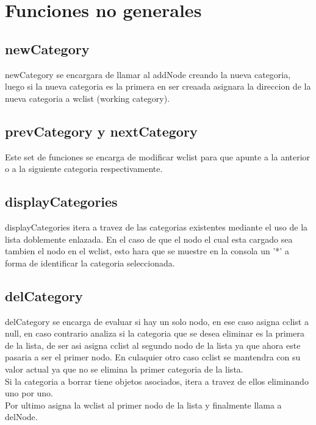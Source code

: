 \documentclass[]{article}
\begin{document}
\section{Funciones no generales}

\subsection{newCategory}
newCategory se encargara de llamar al addNode creando la nueva categoria, luego si la nueva categoria es la primera en ser creaada asignara la direccion de la nueva categoria a wclist (working category).\\

\subsection{prevCategory y nextCategory}
Este set de funciones se encarga de modificar wclist para que apunte a la anterior o a la siguiente categoria respectivamente.\\
\subsection{displayCategories}
displayCategories itera a travez de las categorias existentes mediante el uso de la lista doblemente enlazada. En el caso de que el nodo el cual esta cargado sea tambien el nodo en el wclist, esto hara que se muestre en la consola un '*' a forma de identificar la categoria seleccionada.\\
\subsection{delCategory}

delCategory se encarga de evaluar si hay un solo nodo, en ese caso asigna cclist a null, en caso contrario analiza si la categoria que se desea eliminar es la primera de la lista, de ser asi asigna cclist al segundo nodo de la lista ya que ahora este pasaria a ser el primer nodo. En culaquier otro caso cclist se mantendra con su valor actual ya que no se elimina la primer categoria de la lista.\\

Si la categoria a borrar tiene objetos asociados, itera a travez de ellos eliminando uno por uno.\\

Por ultimo asigna la wclist al primer nodo de la lista y finalmente llama a delNode.\\
\end{document}

